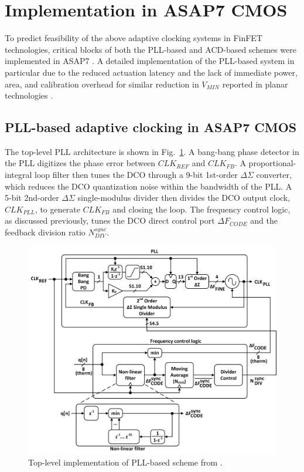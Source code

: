 \documentclass[twoside,9pt,journal,letterpage]{IEEEtran}
\begin{document}
\vspace{-3pt}
\section{Implementation in ASAP7 CMOS}
\label{sec:implementation}
To predict feasibility of the above adaptive clocking systems in FinFET technologies, critical blocks of both the PLL-based \cite{hashimoto2018} and ACD-based \cite{wilcox2015} schemes were implemented in ASAP7 \cite{asap7}. A detailed implementation of the PLL-based system in particular due to the reduced actuation latency and the lack of immediate power, area, and calibration overhead for similar reduction in $V_{MIN}$ reported in planar technologies \cite{hashimoto2018,wilcox2015}.

\vspace{-7pt}
\subsection{PLL-based adaptive clocking in ASAP7 CMOS}
The top-level PLL architecture is shown in Fig.\ \ref{fig:pll_model}. A bang-bang phase detector in the PLL digitizes the phase error between $CLK_{REF}$ and $CLK_{FB}$. A proportional-integral loop filter then tunes the DCO through a 9-bit 1st-order $\Delta\Sigma$ converter, which reduces the DCO quantization noise within the bandwidth of the PLL. A 5-bit 2nd-order $\Delta\Sigma$ single-modulus divider then divides the DCO output clock, $CLK_{PLL}$, to generate $CLK_{FB}$ and closing the loop. The frequency control logic, as discussed previously, tunes the DCO direct control port $\Delta F_{CODE}$ and the feedback division ratio $N_{DIV}^{sync}$.
\vspace{-10pt}
\begin{figure}[h]
	\centering
	\includegraphics[width=\columnwidth]{fig_pll_model}
	\caption{Top-level implementation of PLL-based scheme from \cite{hashimoto2018}.}
	\label{fig:pll_model}
\end{figure}
\end{document}
